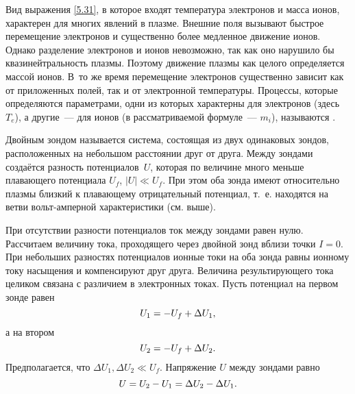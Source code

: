 \begin{lab:note}
Вид выражения \eqref{5.31}, в которое входят температура электронов и масса
ионов, характерен для многих явлений в плазме.
Внешние поля вызывают быстрое перемещение электронов и существенно более
медленное движение ионов. Однако разделение электронов и ионов невозможно,
так как оно нарушило бы квазинейтральность плазмы.
Поэтому движение плазмы как целого определяется массой ионов. 
В~то же время перемещение электронов существенно зависит как от
приложенных полей, так и от электронной температуры. Процессы, которые
определяются параметрами, одни из которых
характерны для электронов (здесь~$T_e$), а другие~--- для ионов (в
рассматриваемой формуле~--- $m_i$), называются .
\end{lab:note}


\label{sec:double}

Двойным зондом называется система, состоящая из двух одинаковых зондов,
расположенных на небольшом расстоянии друг от
друга. Между зондами создаётся разность потенциалов~$U$, которая по величине много
меньше плавающего потенциала $U_f$, $|U|\ll U_f$. При
этом оба зонда имеют относительно плазмы близкий к плавающему отрицательный
потенциал, т.~е. находятся на  ветви
вольт-амперной характеристики (см. выше).

При отсутствии разности потенциалов ток между зондами равен нулю. Рассчитаем
величину тока, проходящего через двойной
зонд вблизи точки $I=0$. При небольших разностях потенциалов ионные токи на оба
зонда равны ионному току насыщения и
компенсируют друг друга. Величина результирующего тока целиком связана с
различием в электронных токах. Пусть потенциал
на первом зонде равен
\begin{equation*}
	\eqmark{5.32}
	U_1=-U_f+\Delta U_1,
\end{equation*}
а на втором
\begin{equation*}
	\eqmark{5.33}
	U_2=-U_f+\Delta U_2.
\end{equation*}
Предполагается, что $\Delta U_1, \Delta U_2 \ll U_f$.
Напряжение $U$ между зондами равно
\begin{equation*}
	\eqmark{5.34}
	U=U_2-U_1=\Delta U_2-\Delta U_1.
\end{equation*}

